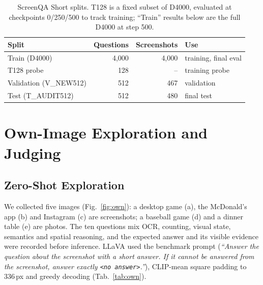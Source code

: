 \documentclass[10pt,twocolumn,letterpaper]{article}
\newcommand{\noans}{\texttt{\textless no answer\textgreater}}
\begin{document}
\begin{table}[t]
  \centering
  \small
  \begin{tabular}{lrrl}
    \toprule
    Split & Questions & Screenshots & Use \\
    \midrule
    Train (D4000)          & 4,000 & 4,000 & training, final eval \\
    \quad T128 probe       & 128   & --    & training probe \\
    Validation (V\_NEW512) & 512   & 467   & validation \\
    Test (T\_AUDIT512)     & 512   & 480   & final test \\
    \bottomrule
  \end{tabular}
  \caption{ScreenQA Short splits. T128 is a fixed subset of D4000, evaluated at checkpoints 0/250/500 to track training; ``Train'' results below are the full D4000 at step 500.}
  \label{tab:splits}
\end{table}


\section{Own-Image Exploration and Judging}
\label{sec:own}

\subsection{Zero-Shot Exploration}

We collected five images (Fig.~\ref{fig:own}): a desktop game (a), the McDonald's app (b) and Instagram (c) are screenshots; a baseball game (d) and a dinner table (e) are photos. The ten questions mix OCR, counting, visual state, semantics and spatial reasoning, and the expected answer and its visible evidence were recorded before inference. LLaVA used the benchmark prompt (\emph{``Answer the question about the screenshot with a short answer. If it cannot be answered from the screenshot, answer exactly \noans.''}), CLIP-mean square padding to 336\,px and greedy decoding (Tab.~\ref{tab:own}).
\end{document}
